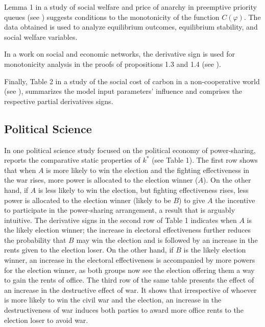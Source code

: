 \documentclass[11pt]{book}
\begin{document}
Lemma 1 in a study of social welfare and price of anarchy in preemptive priority queues (see \cite{chamberlain2020social}) suggests conditions to the
monotonicity of the function $C(\varphi)$. The data obtained is used to analyze equilibrium outcomes, equilibrium stability, and social welfare variables.

In a work on social and economic networks, the derivative sign is used for monotonicity analysis in the proofs
of propositions 1.3 and 1.4 (see \cite{cortes2020essays}).

Finally, Table 2 in a study of the social cost of carbon in a
non-cooperative world (see \cite{hambel2021social}), summarizes the model input
parameters' influence and comprises the respective partial derivatives
signs.


\subsection{Political Science}

In one political science study focused on the political economy of power-sharing, \cite{tridimas2011political} reports the comparative static
properties of $k^{*}$ (see Table 1). The first row shows that when $A$ is more
likely to win the election and the fighting effectiveness in the war rises, more power is allocated to the election winner ($A$). On the
other hand, if $A$ is less likely to win the election, but fighting
effectiveness rises, less power is allocated to the election winner
(likely to be $B$) to give $A$ the incentive to participate in the
power-sharing arrangement, a result that is arguably intuitive. The derivative signs in the second row of Table 1 indicates when $A$ is the likely
election winner; the increase in electoral effectiveness further
reduces the probability that $B$ may win the election and is followed by an increase in the rents given to the election loser.
On the other hand, if $B$ is the likely election winner, an increase
in the electoral effectiveness is accompanied by more powers for the
election winner, as both groups now see the election offering them
a way to gain the rents of office. The third row of the same table presents the effect
of an increase in the destructive effect of war. It shows that irrespective
of whoever is more likely to win the civil war and the election, an
increase in the destructiveness of war induces both parties to award
more office rents to the election loser to avoid war.
\end{document}

